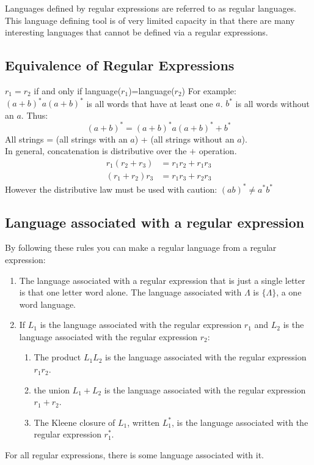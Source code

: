Languages defined by regular expressions are referred to as regular languages. This language defining tool is of very limited capacity in that there are many interesting languages that cannot be defined via a regular expressions.

\subsection{Equivalence of Regular Expressions}

\(r_1=r_2\) if and only if language(\(r_1\))=language(\(r_2\))
For example: \((a+b)^*a(a+b)^*\) is all words that have at least one \(a\). \(b^*\) is all words without an \(a\). Thus:
\begin{equation*}
    (a+b)^* = (a+b)^*a(a+b)^* + b^*
\end{equation*}
All strings = (all strings with an \(a\)) + (all strings without an \(a\)).\\
In general, concatenation is distributive over the \(+\) operation.
\begin{align*}
    r_1(r_2+r_3) &= r_1r_2 + r_1r_3\\
    (r_1+r_2)r_3 &= r_1r_3 + r_2r_3
\end{align*}
However the distributive law must be used with caution: \((ab)^* \neq a^*b^*\)

\subsection{Language associated with a regular expression}
By following these rules you can make a regular language from a regular expression:
\begin{enumerate}
    \item The language associated with a regular expression that is just a single letter is that one letter word alone.
    The language associated with \(\Lambda\) is \(\{\Lambda\}\), a one word language.
    \item If \(L_1\) is the language associated with the regular expression \(r_1\) and \(L_2\) is the language associated with the regular expression \(r_2\):
    \begin{enumerate}
        \item The product \(L_1L_2\) is the language associated with the regular expression \(r_1r_2\).
        \item the union \(L_1+L_2\) is the language associated with the regular expression \(r_1+r_2\).
        \item The Kleene closure of \(L_1\), written \(L_1^*\), is the language associated with the regular expression \(r_1^*\).
    \end{enumerate}
\end{enumerate}
For all regular expressions, there is some language associated with it.

